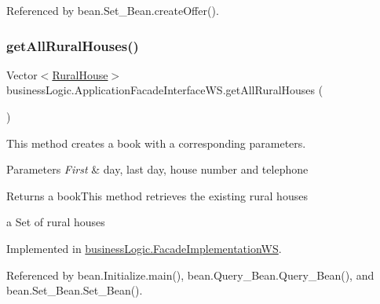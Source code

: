 Referenced by bean.\+Set\+\_\+\+Bean.\+create\+Offer().

\mbox{\label{interfacebusinessLogic_1_1ApplicationFacadeInterfaceWS_a553cbfb37ea9f1621ba76ad8308a15da}} 
\subsubsection{\texorpdfstring{getAllRuralHouses()}{getAllRuralHouses()}}
{\footnotesize\ttfamily Vector$<$\mbox{\hyperlink{classdomain_1_1RuralHouse}{Rural\+House}}$>$ business\+Logic.\+Application\+Facade\+Interface\+W\+S.\+get\+All\+Rural\+Houses (\begin{DoxyParamCaption}{ }\end{DoxyParamCaption})}



This method creates a book with a corresponding parameters. 


\begin{DoxyParams}{Parameters}
{\em First} & day, last day, house number and telephone \\
\hline
\end{DoxyParams}
\begin{DoxyReturn}{Returns}
a book\+This method retrieves the existing rural houses

a Set of rural houses 
\end{DoxyReturn}


Implemented in \mbox{\hyperlink{classbusinessLogic_1_1FacadeImplementationWS_aa6f21ddb40ca6cd752a13e31ff016e7e}{business\+Logic.\+Facade\+Implementation\+WS}}.



Referenced by bean.\+Initialize.\+main(), bean.\+Query\+\_\+\+Bean.\+Query\+\_\+\+Bean(), and bean.\+Set\+\_\+\+Bean.\+Set\+\_\+\+Bean().

\mbox{\label{interfacebusinessLogic_1_1ApplicationFacadeInterfaceWS_ae338a96d039003c64fceb68d667736f1}} 
